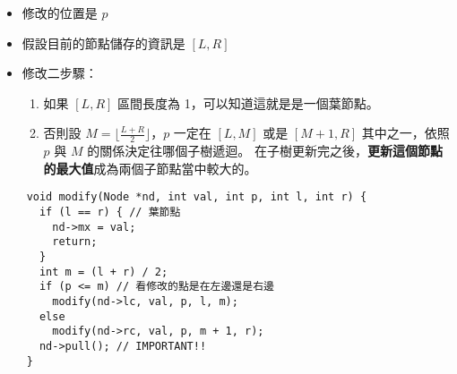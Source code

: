 \documentclass[standalone]{beamer}
\begin{document}
\begin{frame}{}
  \begin{itemize}
    \item 修改的位置是 \(p\)
    \item 假設目前的節點儲存的資訊是 \([L, R]\)
    \item 修改二步驟：
    \begin{enumerate}
      \item
        如果 \([L, R]\) 區間長度為 1，可以知道這就是是一個葉節點。
      \item
          否則設 \(M = \lfloor \frac{L+R}{2} \rfloor\)，\(p\) 一定在 \([L, M]\) 或是 \([M+1, R]\) 其中之一，依照 \(p\) 與 \(M\) 的關係決定往哪個子樹遞迴。
          在子樹更新完之後，\textbf{更新這個節點的最大值}成為兩個子節點當中較大的。
    \end{enumerate}
  \end{itemize}
\end{frame}

\begin{frame}[fragile]{}
  \begin{verbatim}
    void modify(Node *nd, int val, int p, int l, int r) {
      if (l == r) { // 葉節點
        nd->mx = val;
        return;
      }
      int m = (l + r) / 2;
      if (p <= m) // 看修改的點是在左邊還是右邊
        modify(nd->lc, val, p, l, m);
      else
        modify(nd->rc, val, p, m + 1, r);
      nd->pull(); // IMPORTANT!!
    }
  \end{verbatim}
\end{frame}
\end{document}

